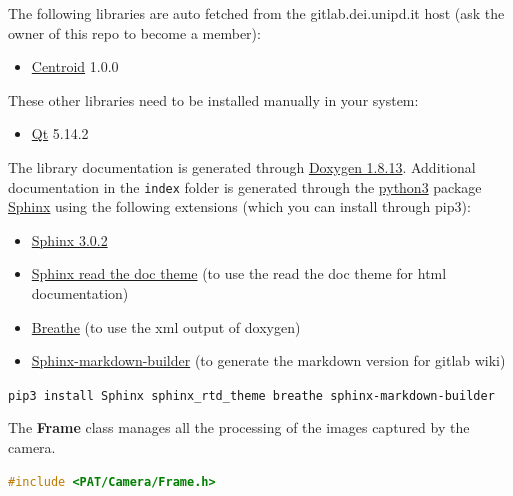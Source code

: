 
The following libraries are auto fetched from the gitlab.dei.unipd.it
host (ask the owner of this repo to become a member):

\begin{itemize}
  \tightlist
  \item
        \href{https://gitlab.dei.unipd.it/PAT/Centroid.git}{Centroid} 1.0.0
\end{itemize}

These other libraries need to be installed manually in your system:

\begin{itemize}
  \tightlist
  \item
        \href{https://www.qt.io/}{Qt} 5.14.2
\end{itemize}

The library documentation is generated through
\href{http://www.doxygen.nl/download.html}{Doxygen 1.8.13}. Additional
documentation in the \texttt{index} folder is generated through the
\href{https://www.anaconda.com/products/individual}{python3} package
\href{https://www.sphinx-doc.org/en/master/}{Sphinx} using the following
extensions (which you can install through pip3):

\begin{itemize}
  \tightlist
  \item
        \href{https://pypi.org/project/Sphinx/}{Sphinx 3.0.2}
  \item
        \href{https://sphinx-rtd-theme.readthedocs.io/en/stable/}{Sphinx read
          the doc theme} (to use the read the doc theme for html documentation)
  \item
        \href{https://pypi.org/project/breathe/}{Breathe} (to use the xml
        output of doxygen)
  \item
        \href{https://pypi.org/project/sphinx-markdown-builder/}{Sphinx-markdown-builder}
        (to generate the markdown version for gitlab wiki)
\end{itemize}

\texttt{pip3\ install\ Sphinx\ sphinx\_rtd\_theme\ breathe\ sphinx-markdown-builder}



The \textbf{Frame} class manages all the processing of the images
captured by the camera.

\begin{lstlisting}[language=c++, gobble=2]
  #include <PAT/Camera/Frame.h>
\end{lstlisting}

